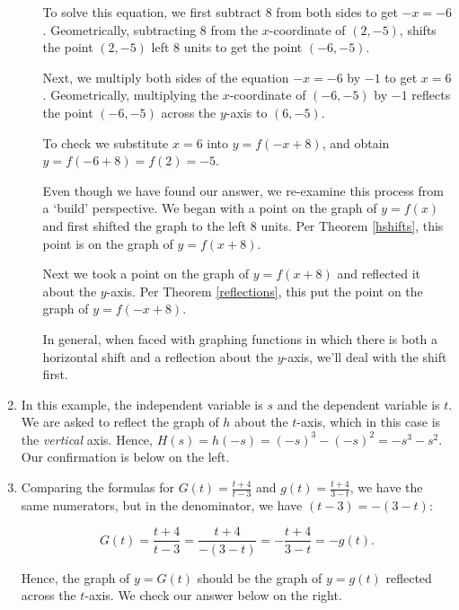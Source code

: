 \documentclass{ximera}
\begin{document}
\begin{example}
\begin{enumerate}
\begin{enumerate}
 \smallskip
 
 To solve this equation, we first subtract $8$ from both sides to get $-x = -6$.   Geometrically,  subtracting $8$ from the $x$-coordinate of $(2,-5)$, shifts the point $(2,-5)$  left $8$ units to get the point $(-6,-5)$.   
 
 \smallskip
 
 Next, we multiply both sides of the equation $-x = -6$ by $-1$ to get $x = 6$.  Geometrically, multiplying the $x$-coordinate of $(-6,-5)$ by $-1$ reflects the point $(-6,-5)$  across the $y$-axis to  $(6,-5)$.   
 
 \smallskip
 
 To check we substitute $x=6$ into $y = f(-x+8)$,  and obtain $y = f(-6+8) = f(2) = -5$. 
 
 \smallskip
 
 Even though we have found our answer, we re-examine this process from a `build' perspective.  We began with a point on the graph of $y=f(x)$ and first shifted the graph to the left $8$ units.   Per Theorem \ref{hshifts}, this point is on the graph of $y=f(x+8)$.  
 
 \smallskip
 
 Next we took a point on the graph of $y=f(x+8)$ and reflected it about the $y$-axis.  Per Theorem \ref{reflections}, this put the point on the graph of $y=f(-x+8)$. 
 
 \smallskip
 
  In general, when faced with graphing functions in which there is both a horizontal shift and a reflection about the $y$-axis, we'll deal with the shift first.
  
  \end{enumerate}
 
  \item  In this example, the independent variable is $s$ and the dependent variable is $t$.   We are asked to reflect the graph of $h$ about the $t$-axis, which in this case is the \textit{vertical} axis.  Hence,  $H(s) = h(-s) = (-s)^3-(-s)^2 = -s^3-s^2$. Our confirmation is below on the left.
 
 \item Comparing the formulas for $G(t) = \frac{t+4}{t-3}$ and $g(t) =\frac{t+4}{3-t}$, we have the same numerators, but in the denominator, we have $(t-3) = -(3-t)$:  
 
 \[G(t) =  \dfrac{t+4}{t-3} = \dfrac{t+4}{-(3-t)} = - \dfrac{t+4}{3-t} = -g(t). \]
 
 Hence, the graph of $y=G(t)$ should be the graph of $y=g(t)$ reflected across the $t$-axis. We check our answer below on the right.
 

\end{enumerate}
\end{example}
\end{document}
